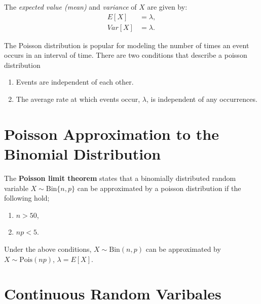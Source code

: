 \begin{note}
	The \textit{expected value (mean)} and \textit{variance} of $X$ are given by:
	\begin{align}
	E[X] &= \lambda,  \label{mod2:eq:Poisson:Mean} \\ 
	Var[X] &= \lambda. \label{mod2:eq:Poisson:Variance} 
	\end{align}
\end{note}


\begin{note} \label{mod2:note:Poisson:Conditions}
	The Poisson distribution is popular for modeling the number of times an event occurs in an interval of time. There are two conditions that describe a poisson distribution
	\begin{enumerate}[label = (\roman*)]
		\item Events are independent of each other.
		\item The average rate at which events occur, $\lambda$, is independent of any occurrences.
	\end{enumerate}
\end{note}


\section {Poisson Approximation to the Binomial Distribution} \label{mod2:section:PoissonApproxBinomial}
 
 \begin{defn} \label{mod2:defn:PoissonApproxBinomial}
The \textbf{Poisson limit theorem} states that a binomially distributed random variable $X \sim \text{Bin}\{n, p\}$ can be approximated by a poisson distribution if the following hold;
\begin{enumerate}[label = (\roman*)]
	\item $n > 50$,
	\item $np < 5$.
\end{enumerate}

Under the above conditions, $X \sim \text{Bin}(n, p)$ can be approximated by $X \sim \text{Pois}(np)$, $\lambda = E[X]$.

\end{defn}
	


\section{Continuous Random Varibales} \label{mod2:section:ContinuousRandomVar}

